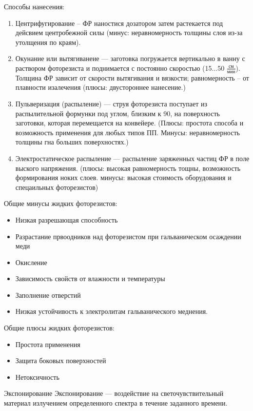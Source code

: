 \documentclass{article}
\begin{document}
Способы нанесения:
\begin{enumerate}
	\item Центрифугирование -- ФР наностися дозатором затем растекается под дейсвием центробежной силы (минус: неравномерность толщины слоя из-за утолщения по краям).
	\item Окунание или вытягиванеие --- заготовка погружается вертикально в ванну с раствором фоторезиста и поднимается с постоянно скоростью (15...50 $ \frac{см}{мин} $). Толщина ФР зависит от скорости вытягивания и вязкости; равномерность -- от плавности изалечения
(плюсы: двустороннее нанесение.)
	\item Пульверизация (распыление) --- струя фоторезиста поступает из распылительной формунки под углом, близким к $90$, на поверхность заготовки, которая перемещается на конвейере. (Плюсы: простота способа и возможность применения для любых типов ПП. Минусы: неравномерность толщины гна больших поверхностях.)
	\item Электростатическое распыление --- распыление заряженных частиц ФР в поле выского напряжения. (плюсы: высокая равномерность тощны, возможность формирования ноких слоев. минусы: высокая стоимость оборудования и спецаильных фоторезистов)
\end{enumerate}

Общие минусы жидких фоторезистов:
\begin{itemize}
	\item Низкая разрешающая способность
	\item Разрастание првоодников над фоторезистом при гальваническом осаждении меди
	\item Окисление
	\item Зависимость свойств от влажности и температуры
	\item Заполнение отверстий
	\item Низкая устойчивость к электролитам гальванического меднения.
\end{itemize}

Общие плюсы жидких фоторезистов:
\begin{itemize}
	\item Простота применения
	\item Защита боковых поверхностей
	\item Нетоксичность
\end{itemize}

Экспонирование
Экспонирование --- воздействие на светочувствительный материал излучением определенного спектра в течение заданного времени.
\end{document}
